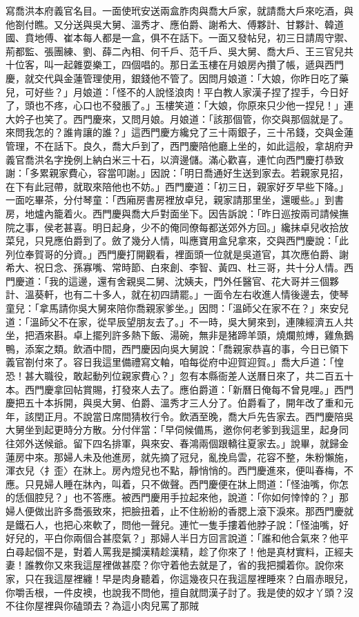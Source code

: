 寫喬洪本府義官名目。一面使玳安送兩盒胙肉與喬大戶家，就請喬大戶來吃酒，與他劄付瞧。又分送與吳大舅、溫秀才、應伯爵、謝希大、傅夥計、甘夥計、韓道國、賁地傅、崔本每人都是一盒，俱不在話下。一面又發帖兒，初三日請周守禦、荊都監、張團練、劉、薛二內相、何千戶、范千戶、吳大舅、喬大戶、王三官兒共十位客，叫一起雜耍樂工，四個唱的。那日孟玉樓在月娘房內攢了帳，遞與西門慶，就交代與金蓮管理使用，銀錢他不管了。因問月娘道：「大娘，你昨日吃了藥兒，可好些？」月娘道：「怪不的人說怪浪肉！平白教人家漢子捏了捏手，今日好了，頭也不疼，心口也不發脹了。」玉樓笑道：「大娘，你原來只少他一捏兒！」連大妗子也笑了。西門慶來，又問月娘。月娘道：「該那個管，你交與那個就是了。來問我怎的？誰肯讓的誰？」這西門慶方纔兌了三十兩銀子，三十吊錢，交與金蓮管理，不在話下。良久，喬大戶到了，西門慶陪他廳上坐的，如此這般，拿胡府尹義官喬洪名字挽例上納白米三十石，以濟邊儲。滿心歡喜，連忙向西門慶打恭致謝：「多累親家費心，容當叩謝。」因說：「明日喬通好生送到家去。若親家見招，在下有此冠帶，就取來陪他也不妨。」西門慶道：「初三日，親家好歹早些下降。」一面吃畢茶，分付琴童：「西廂房書房裡放卓兒，親家請那里坐，還暖些。」到書房，地爐內籠着火。西門慶與喬大戶對面坐下。因告訴說：「昨日巡按兩司請候撫院之事，侯老甚喜。明日起身，少不的俺同僚每都送郊外方回。」纔抹卓兒收拾放菜兒，只見應伯爵到了。斂了幾分人情，叫應寶用盒兒拿來，交與西門慶說：「此列位奉賀哥的分資。」西門慶打開觀看，裡面頭一位就是吳道官，其次應伯爵、謝希大、祝日念、孫寡嘴、常時節、白來創、李智、黃四、杜三哥，共十分人情。西門慶道：「我的這邊，還有舍親吳二舅、沈姨夫，門外任醫官、花大哥并三個夥計、溫葵軒，也有二十多人，就在初四請罷。」一面令左右收進人情後邊去，使琴童兒：「拿馬請你吳大舅來陪你喬親家爹坐。」因問：「溫師父在家不在？」來安兒道：「溫師父不在家，從早辰望朋友去了。」不一時，吳大舅來到，連陳經濟五人共坐，把酒來斟。卓上擺列許多熱下飯、湯碗，無非是猪蹄羊頭，燒爛煎煿，雞魚鵝鴨，添案之類。飲酒中間，西門慶因向吳大舅說：「喬親家恭喜的事，今日已領下義官劄付來了。容日我這里備禮寫文軸，咱每從府中迎賀迎賀。」喬大戶道：「惶恐！甚大職役，敢起動列位親家費心？」忽有本縣衙差人送曆日來了，共二百五十本。西門慶拿回帖賞賜，打發來人去了。應伯爵道：「新曆日俺每不曾見哩。」西門慶把五十本拆開，與吳大舅、伯爵、溫秀才三人分了。伯爵看了，開年改了重和元年，該閏正月。不說當日席間猜枚行令。飲酒至晚，喬大戶先告家去。西門慶陪吳大舅坐到起更時分方散。分付伴當：「早伺候備馬，邀你何老爹到我這里，起身同往郊外送候爺。留下四名排軍，與來安、春鴻兩個跟轎往夏家去。」說畢，就歸金蓮房中來。那婦人未及他進房，就先摘了冠兒，亂挽烏雲，花容不整，朱粉懶施，渾衣兒〈扌歪〉在牀上。房內燈兒也不點，靜悄悄的。西門慶進來，便叫春梅，不應。只見婦人睡在牀內，叫着，只不做聲。西門慶便在牀上問道：「怪油嘴，你怎的恁個腔兒？」也不答應。被西門慶用手拉起來他，說道：「你如何悻悻的？」那婦人便做出許多喬張致來，把臉扭着，止不住紛紛的香腮上滾下淚來。那西門慶就是鐵石人，也把心來軟了，問他一聲兒。連忙一隻手摟着他脖子說：「怪油嘴，好好兒的，平白你兩個合甚麼氣？」那婦人半日方回言說道：「誰和他合氣來？他平白尋起個不是，對着人罵我是攔漢精趁漢精，趁了你來了！他是真材實料，正經夫妻！誰教你又來我這屋裡做甚麼？你守着他去就是了，省的我把攔着你。說你來家，只在我這屋裡纏！早是肉身聽着，你這幾夜只在我這屋裡睡來？白眉赤眼兒，你嚼舌根，一件皮襖，也說我不問他，擅自就問漢子討了。我是使的奴才丫頭？沒不往你屋裡與你磕頭去？為這小肉兒罵了那賊